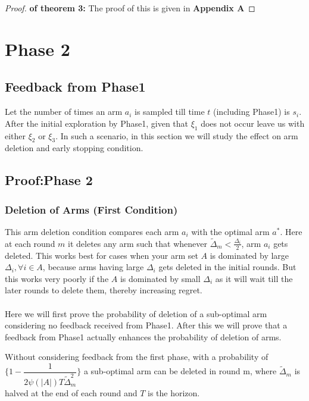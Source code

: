 \begin{proof}\textbf{ of theorem 3:}
The proof of this is given in \textbf{Appendix A}
\end{proof}


\section{Phase 2}

\subsection{Feedback from Phase1}
Let the number of times an arm $a_{i}$ is sampled till time $t$ (including Phase1) is $s_{i}$. After the initial exploration by Phase1, given that $\xi_{1}$ does not occur leave us with either $\xi_{2}$ or $\xi_{3}$. In such a scenario, in this section we will study the effect on arm deletion and early stopping condition.

\subsection{Proof:Phase 2}

\subsubsection{Deletion of Arms (First Condition)}
This arm deletion condition compares each arm $a_{i}$ with the optimal arm $a^{*}$. Here at each round $m$ it deletes any arm such that whenever $\tilde{\Delta}_{m}<\frac{\Delta_{i}}{2}$, arm $a_{i}$ gets deleted. This works best for cases when your arm set $A$ is dominated by large $\Delta_{i}, \forall i\in A$, because arms having large $\Delta_{i}$ gets deleted in the initial rounds. But this works very poorly if the $A$ is dominated by small $\Delta_{i}$ as it will wait till the later rounds to delete them, thereby increasing regret. 
\paragraph{}Here we will first prove the probability of deletion of a sub-optimal arm considering no feedback received from Phase1. After this we will prove that a feedback from Phase1 actually enhances the probability of deletion of arms.

\begin{theorem}
Without considering feedback from the  first phase, with a probability of $\bigg\lbrace 1-\dfrac{1}{2\psi(|A|)T\tilde{\Delta}_{m}^{2}}\bigg\rbrace$ a sub-optimal arm can be deleted in round m, where $\tilde{\Delta}_{m}$ is halved at the end of each round and $T$ is the horizon.
\end{theorem}

